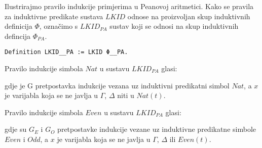 Ilustrirajmo pravilo indukcije primjerima u Peanovoj aritmetici.
Kako se pravila za induktivne predikate sustava \(\mathit{LKID}\) odnose na proizvoljan skup induktivnih definicija \(\Phi\),
označimo s \(\mathit{LKID}_{\mathit{PA}}\)  sustav koji se odnosi na skup induktivnih defincija \(\Phi_{\mathit{PA}}\).
\begin{verbatim}
Definition LKID__PA := LKID Φ__PA.
\end{verbatim}
\begin{example}
  Pravilo indukcije simbola \(\mathit{Nat}\)
  u sustavu \(\mathit{LKID}_{\mathit{PA}}\) glasi:
  \begin{prooftree}
  \end{prooftree}
  \noindent gdje je G pretpostavka indukcije vezana uz induktivni predikatni simbol \(\mathit{Nat}\),
  a \(x\) je varijabla koja se ne javlja u \(\Gamma\), \(\Delta\) niti u \(\mathit{Nat}(t)\).
\end{example}

\begin{example}
  Pravilo indukcije simbola  \(\mathit{Even}\)
  u sustavu \(\mathit{LKID}_{\mathit{PA}}\) glasi:
  \begin{small}
    \begin{prooftree}
    \end{prooftree}
  \end{small}
  \noindent gdje su \(G_{E}\) i \(G_{O}\) pretpostavke indukcije vezane uz
  induktivne predikatne simbole \(\mathit{Even}\) i \(\mathit{Odd}\),
  a \(x\) je varijabla koja se ne javlja u \(\Gamma\), \(\Delta\) ili \(\mathit{Even}(t)\).
\end{example}

